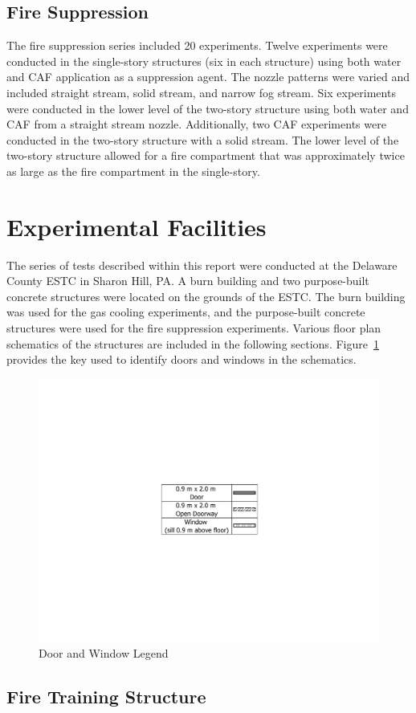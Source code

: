 \documentclass[12pt,oneside]{book}
\begin{document}
\subsection{Fire Suppression}
\label{sec:desc_Fire_Suppression}

The fire suppression series included 20 experiments. Twelve experiments were conducted in the single-story structures (six in each structure) using both water and CAF application as a suppression agent. The nozzle patterns were varied and included straight stream, solid stream, and narrow fog stream. Six experiments were conducted in the lower level of the two-story structure using both water and CAF from a straight stream nozzle. Additionally, two CAF experiments were conducted in the two-story structure with a solid stream. The lower level of the two-story structure allowed for a fire compartment that was approximately twice as large as the fire compartment in the single-story.

\section{Experimental Facilities}
\label{sec:Experimental_Facility}

The series of tests described within this report were conducted at the Delaware County ESTC in Sharon Hill, PA. A burn building and two purpose-built concrete structures were located on the grounds of the ESTC. The burn building was used for the gas cooling experiments, and the purpose-built concrete structures were used for the fire suppression experiments. Various floor plan schematics of the structures are included in the following sections. Figure~\ref{fig:Door_Status_Legend} provides the key used to identify doors and windows in the schematics.

\begin{figure}[!ht]
	\includegraphics[width=.35\columnwidth]{../Figures/Floor_Plans/PDFs/DelCo_2012_Door_Legend}
	\caption{Door and Window Legend}
	\label{fig:Door_Status_Legend}
\end{figure}

\subsection{Fire Training Structure}
\label{sec:Burn_Building}
\end{document}
